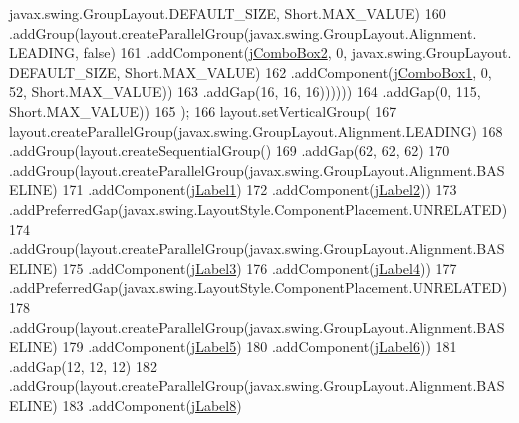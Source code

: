 \begin{DoxyCode}
      javax.swing.GroupLayout.DEFAULT\_SIZE, Short.MAX\_VALUE)
160                                     .addGroup(layout.createParallelGroup(javax.swing.GroupLayout.Alignment.
      LEADING, \textcolor{keyword}{false})
161                                         .addComponent(\mbox{\hyperlink{class_interfaz_package_1_1_verificar_libro_a6e3256102994e7764c50c7a37aebc859}{jComboBox2}}, 0, javax.swing.GroupLayout.
      DEFAULT\_SIZE, Short.MAX\_VALUE)
162                                         .addComponent(\mbox{\hyperlink{class_interfaz_package_1_1_verificar_libro_a5f8fd3453828fec1a8baafb3788ee5c6}{jComboBox1}}, 0, 52, Short.MAX\_VALUE))
163                                     .addGap(16, 16, 16))))))
164                 .addGap(0, 115, Short.MAX\_VALUE))
165         );
166         layout.setVerticalGroup(
167             layout.createParallelGroup(javax.swing.GroupLayout.Alignment.LEADING)
168             .addGroup(layout.createSequentialGroup()
169                 .addGap(62, 62, 62)
170                 .addGroup(layout.createParallelGroup(javax.swing.GroupLayout.Alignment.BASELINE)
171                     .addComponent(\mbox{\hyperlink{class_interfaz_package_1_1_verificar_libro_ae036e1136fd3ea0a459815b6fbad2974}{jLabel1}})
172                     .addComponent(\mbox{\hyperlink{class_interfaz_package_1_1_verificar_libro_ae1649adac4d57368e1c269c7dfa7ea8e}{jLabel2}}))
173                 .addPreferredGap(javax.swing.LayoutStyle.ComponentPlacement.UNRELATED)
174                 .addGroup(layout.createParallelGroup(javax.swing.GroupLayout.Alignment.BASELINE)
175                     .addComponent(\mbox{\hyperlink{class_interfaz_package_1_1_verificar_libro_a07f26adefc6f29a9f6335d4eceac2a96}{jLabel3}})
176                     .addComponent(\mbox{\hyperlink{class_interfaz_package_1_1_verificar_libro_a3df20770732e9526771c5a14aa5afb6a}{jLabel4}}))
177                 .addPreferredGap(javax.swing.LayoutStyle.ComponentPlacement.UNRELATED)
178                 .addGroup(layout.createParallelGroup(javax.swing.GroupLayout.Alignment.BASELINE)
179                     .addComponent(\mbox{\hyperlink{class_interfaz_package_1_1_verificar_libro_af0ca29553abca825c883eacf5e075ce6}{jLabel5}})
180                     .addComponent(\mbox{\hyperlink{class_interfaz_package_1_1_verificar_libro_a5ed33c5473e49a9a27a02f94f1152818}{jLabel6}}))
181                 .addGap(12, 12, 12)
182                 .addGroup(layout.createParallelGroup(javax.swing.GroupLayout.Alignment.BASELINE)
183                     .addComponent(\mbox{\hyperlink{class_interfaz_package_1_1_verificar_libro_a31cbff3e8a6d5b60fc95e9ee6505ffaf}{jLabel8}})

\end{DoxyCode}
